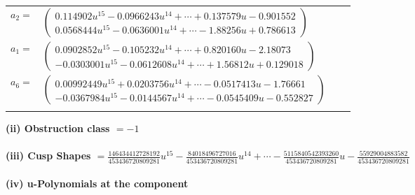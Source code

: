 \documentclass[1p]{elsarticle_modified}
\theoremstyle{definition}
\begin{document}
\begin{tabular}{m{7pt} m{180pt} m{7pt} m{180pt} }
\flushright $a_{2}=$&$\begin{pmatrix}0.114902 u^{15}-0.0966243 u^{14}+\cdots+0.137579 u-0.901552\\0.0568444 u^{15}-0.0636001 u^{14}+\cdots-1.88256 u+0.786613\end{pmatrix}$ \\
\flushright $a_{1}=$&$\begin{pmatrix}0.0902852 u^{15}-0.105232 u^{14}+\cdots+0.820160 u-2.18073\\-0.0303001 u^{15}-0.0612608 u^{14}+\cdots+1.56812 u+0.129018\end{pmatrix}$ \\
\flushright $a_{6}=$&$\begin{pmatrix}0.00992449 u^{15}+0.0203756 u^{14}+\cdots-0.0517413 u-1.76661\\-0.0367984 u^{15}-0.0144567 u^{14}+\cdots-0.0545409 u-0.552827\end{pmatrix}$\\&\end{tabular}
\flushleft \textbf{(ii) Obstruction class $= -1$}\\~\\
\flushleft \textbf{(iii) Cusp Shapes $= \frac{146434412728192}{453436720809281} u^{15}-\frac{84018496727016}{453436720809281} u^{14}+\cdots-\frac{5115840542393260}{453436720809281} u-\frac{55929004883582}{453436720809281}$}\\~\\
\newpage\renewcommand{\arraystretch}{1}
\flushleft \textbf{(iv) u-Polynomials at the component}\newline \\
\end{document}
